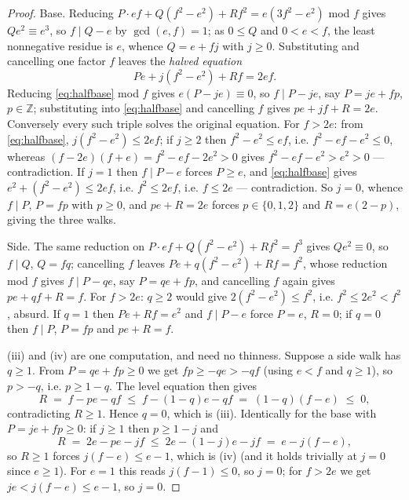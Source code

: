 \documentclass[11pt,reqno]{amsart}
\theoremstyle{plain}
\theoremstyle{definition}
\begin{document}
\begin{proof}
Base. Reducing $P\cdot ef+Q(f^2-e^2)+R f^2=e(3f^2-e^2)$ mod $f$ gives $Qe^2\equiv e^3$, so
$f\mid Q-e$ by $\gcd(e,f)=1$; as $0\le Q$ and $0<e<f$, the least nonnegative residue is $e$, whence
$Q=e+fj$ with $j\ge0$. Substituting and cancelling one factor $f$ leaves the \emph{halved equation}
\begin{equation}\label{eq:halfbase}
Pe+j(f^2-e^2)+Rf=2ef .
\end{equation}
Reducing \eqref{eq:halfbase} mod $f$ gives $e(P-je)\equiv0$, so $f\mid P-je$, say $P=je+fp$,
$p\in\mathbb{Z}$; substituting into \eqref{eq:halfbase} and cancelling $f$ gives $pe+jf+R=2e$.
Conversely every such triple solves the original equation. For $f>2e$: from \eqref{eq:halfbase},
$j(f^2-e^2)\le2ef$; if $j\ge2$ then $f^2-e^2\le ef$, i.e. $f^2-ef-e^2\le0$, whereas
$(f-2e)(f+e)=f^2-ef-2e^2>0$ gives $f^2-ef-e^2>e^2>0$ --- contradiction.
If $j=1$ then $f\mid P-e$ forces $P\ge e$, and \eqref{eq:halfbase} gives
$e^2+(f^2-e^2)\le2ef$, i.e. $f^2\le2ef$, i.e. $f\le2e$ --- contradiction. So $j=0$, whence $f\mid P$,
$P=fp$ with $p\ge0$, and $pe+R=2e$ forces $p\in\{0,1,2\}$ and $R=e(2-p)$, giving the three walks.

Side. The same reduction on $P\cdot ef+Q(f^2-e^2)+Rf^2=f^3$ gives $Qe^2\equiv0$, so $f\mid Q$,
$Q=fq$; cancelling $f$ leaves $Pe+q(f^2-e^2)+Rf=f^2$, whose reduction mod $f$ gives $f\mid P-qe$,
say $P=qe+fp$, and cancelling $f$ again gives $pe+qf+R=f$. For $f>2e$: $q\ge2$ would give
$2(f^2-e^2)\le f^2$, i.e. $f^2\le 2e^2<f^2$, absurd. If $q=1$ then $Pe+Rf=e^2$ and $f\mid P-e$ force
$P=e$, $R=0$; if $q=0$ then $f\mid P$, $P=fp$ and $pe+R=f$.

(iii) and (iv) are one computation, and need no thinness. Suppose a side walk has $q\ge1$. From
$P=qe+fp\ge0$ we get $fp\ge-qe>-qf$ (using $e<f$ and $q\ge1$), so $p>-q$, i.e. $p\ge1-q$. The level
equation then gives
\[
R \;=\; f-pe-qf \;\le\; f-(1-q)e-qf \;=\; (1-q)(f-e)\;\le\;0,
\]
contradicting $R\ge1$. Hence $q=0$, which is (iii). Identically for the base with $P=je+fp\ge0$: if
$j\ge1$ then $p\ge1-j$ and
\[
R \;=\; 2e-pe-jf \;\le\; 2e-(1-j)e-jf \;=\; e-j(f-e),
\]
so $R\ge1$ forces $j(f-e)\le e-1$, which is (iv) (and it holds trivially at $j=0$ since $e\ge1$). For
$e=1$ this reads $j(f-1)\le0$, so $j=0$; for $f>2e$ we get $je<j(f-e)\le e-1$, so $j=0$.
\end{proof}
\end{document}
